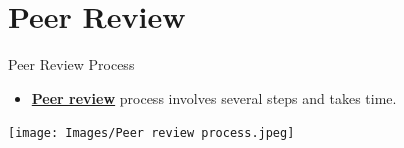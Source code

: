 \documentclass[11pt]{beamer}
\begin{document}

	
\section{Peer Review}
\begin{frame}{Peer Review Process}
\begin{itemize}
    \item {\color{blue}\textbf{\href{https://www.elsevier.com/reviewers/what-is-peer-review}{Peer review}}} process involves several steps and takes time.
\end{itemize}
\centering\texttt{[image: Images/Peer review process.jpeg]}
\end{frame}
\end{document}
